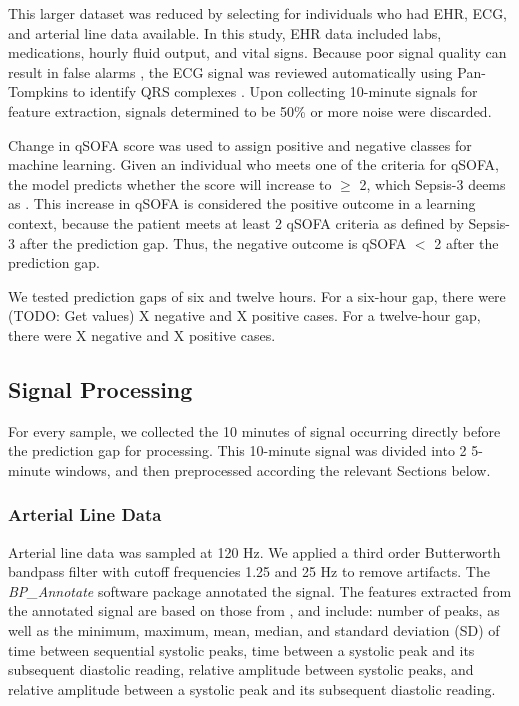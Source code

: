 This larger dataset was reduced by selecting for individuals who had EHR, ECG, and arterial line data available. In this study, EHR data included labs, medications, hourly fluid output, and vital signs. Because poor signal quality can result in false alarms \cite{gambarotta_review_2016}, the ECG signal was reviewed automatically using Pan-Tompkins to identify QRS complexes \cite{pantom_1985, matlab-pantom}. Upon collecting 10-minute signals for feature extraction, signals determined to be 50\% or more noise were discarded.

Change in qSOFA score was used to assign positive and negative classes for machine learning. Given an individual who meets one of the criteria for qSOFA, the model predicts whether the score will increase to $\geq$ 2, which Sepsis-3 deems as  \cite{sepsis-3}. This increase in qSOFA is considered the positive outcome in a learning context, because the patient meets at least 2 qSOFA criteria as defined by Sepsis-3 after the prediction gap. Thus, the negative outcome is qSOFA $<$ 2 after the prediction gap.

We tested prediction gaps of six and twelve hours. For a six-hour gap, there were (TODO: Get values) X negative and X positive cases. For a twelve-hour gap, there were X negative and X positive cases.

\subsection*{Signal Processing} \label{sec:methods_sigproc}
For every sample, we collected the 10 minutes of signal occurring directly before the prediction gap for processing. This 10-minute signal was divided into 2 5-minute windows, and then preprocessed according the relevant Sections below.

\subsubsection*{Arterial Line Data} \label{sec:methods_art_data}
Arterial line data was sampled at 120 Hz. We applied a third order Butterworth bandpass filter with cutoff frequencies 1.25 and 25 Hz  to remove artifacts. The \textit{BP\_Annotate} software package \cite{laurin_bp_annotate_2017} annotated the signal. The features extracted from the annotated signal are based on those from \cite{luo_severity_2012, hernandez_multimodal_2021}, and include: number of peaks, as well as the minimum, maximum, mean, median, and standard deviation (SD) of time between sequential systolic peaks, time between a systolic peak and its subsequent diastolic reading, relative amplitude between systolic peaks, and relative amplitude between a systolic peak and its subsequent diastolic reading.

